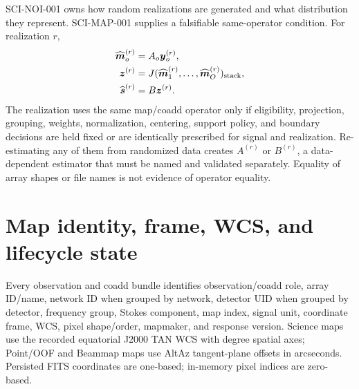 \documentclass[11pt]{article}
\begin{document}
SCI-NOI-001 owns how random realizations are generated and what distribution
they represent. SCI-MAP-001 supplies a falsifiable same-operator condition.
For realization \(r\),
\begin{align}
 \widehat{\boldsymbol m}^{(r)}_o&=A_o\boldsymbol y^{(r)}_o,
 \label{eq:noise-map-operator}\\
 \boldsymbol z^{(r)}&=
 J(\widehat{\boldsymbol m}^{(r)}_1,\ldots,
 \widehat{\boldsymbol m}^{(r)}_O)_{\rm stack},
 \label{eq:noise-selected-stack}\\
 \widehat{\boldsymbol s}^{(r)}&=B\boldsymbol z^{(r)}.
 \label{eq:noise-coadd-operator}
\end{align}
The realization uses the same map/coadd operator only if eligibility,
projection, grouping, weights, normalization, centering, support policy, and
boundary decisions are held fixed or are identically prescribed for signal
and realization. Re-estimating any of them from randomized data creates
\(A^{(r)}\) or \(B^{(r)}\), a data-dependent estimator that must be named and
validated separately. Equality of array shapes or file names is not evidence
of operator equality.

\clearpage
\section{Map identity, frame, WCS, and lifecycle state}

Every observation and coadd bundle identifies observation/coadd role, array
ID/name, network ID when grouped by network, detector UID when grouped by
detector, frequency group, Stokes component, map index, signal unit,
coordinate frame, WCS, pixel shape/order, mapmaker, and response version.
Science maps use the recorded equatorial J2000 TAN WCS with degree spatial
axes; Point/OOF and Beammap maps use AltAz tangent-plane offsets in arcseconds.
Persisted FITS coordinates are one-based; in-memory pixel indices are
zero-based.
\end{document}
